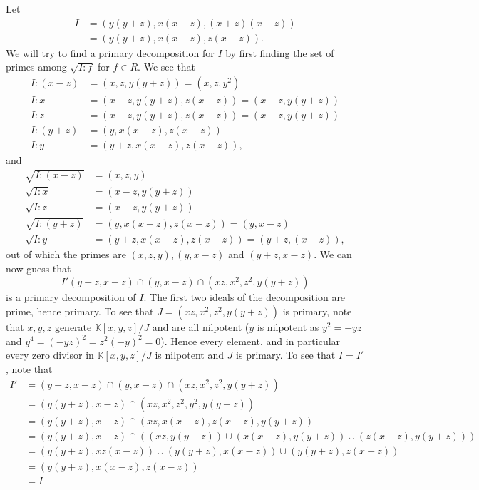\documentclass{article}
\theoremstyle{definition}
\newcommand{\K}{\mathbb{K}}
\begin{document}
Let
\begin{align*}
	I 
	&= 
	(y(y + z), x(x - z), (x + z)(x - z)) \\
	&= 
	(y(y + z), x(x - z), z(x - z)).
\end{align*}
We will try to find a primary decomposition for $I$ by first finding the set of
primes among $\sqrt{I : f}$ for $f \in R$. We see that 
\begin{align*}
	I : (x - z)
	&=
	(x, z, y(y + z))
	=
	(x, z, y^{2}) \\
	I : x 
	&=
	(x - z, y(y + z), z(x - z))
	=
	(x - z, y(y + z)) \\
	I : z 
	&=
	(x - z, y(y + z), z(x - z))
	=
	(x - z, y(y + z)) \\
	I : (y + z)
	&=
	(y, x(x - z), z(x - z)) \\
	I : y
	&=
	(y + z, x(x - z), z(x - z)),
\end{align*}
and 
\begin{align*}
	\sqrt{I : (x - z)}
	&=
	(x, z, y) \\
	\sqrt{I : x}
	&=
	(x - z, y(y + z)) \\
	\sqrt{I : z}
	&=
	(x - z, y(y + z)) \\
	\sqrt{I : (y + z)}
	&=
	(y, x(x - z), z(x - z))
	=
	(y, x - z) \\
	\sqrt{I : y}
	&=
	(y + z, x(x - z), z(x - z))
	=
	(y + z, (x - z)),
\end{align*}
out of which the primes are $(x, z, y), (y, x - z)$ and $(y + z, x - z)$. 
We can now guess that 
\[
	I' (y + z, x - z) \cap (y, x - z) \cap (xz, x^2, z^2, y(y + z))
\] 
is a primary decomposition of $I$. The first two ideals of the decomposition
are prime, hence primary. To see that $J = (xz, x^2, z^2, y(y + z))$ is
primary, note that $x, y, z$ generate $\K[x, y, z] / J$ and are all nilpotent
($y$ is nilpotent as $y^2 = -yz$ and $y^4 = (-yz)^2 = z^2(-y)^2 = 0$). Hence
every element, and in particular every zero divisor in $\K[x, y, z]/J$ is
nilpotent and $J$ is primary. To see that $I = I'$, note that
\begin{align*}
	I'
	&=
	(y + z, x - z) \cap (y, x - z) \cap (xz, x^2, z^2, y(y + z)) \\
	&=
	(y(y + z), x - z) \cap (xz, x^2, z^2, y^2, y(y + z)) \\
	&=
	(y(y + z), x - z) \cap (xz, x(x - z), z(x - z), y(y + z)) \\
	&=
	(y(y + z), x - z) \cap \left(
		(xz, y(y + z))
		\cup 
		(x(x - z), y(y + z))
		\cup
		(z(x - z), y(y + z))
	\right) \\
	&=
	(y(y + z), xz(x - z))
	\cup
	(y(y + z), x(x - z)) 
	\cup
	(y(y + z), z(x - z))  \\
	&=
	(y(y + z), x(x - z), z(x - z)) \\
	&=
	I
\end{align*} 
\end{document}
